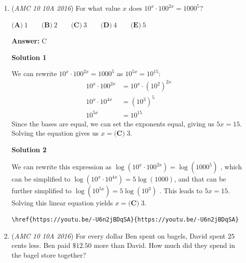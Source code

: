 \begin{enumerate}
 Hence
 \[\frac{I_{11} - I_{10}}{I_9} = \frac{11 I_{10}}{I_9} - 10.\]Do another integration by parts to relate \( I_{10} \) and \( I_9 \):
 \[I_{10} = \int_0^\infty x^{10} e^{-x} \, dx = \left[ -x^{10} e^{-x} \right]_0^\infty + 10 \int_0^\infty x^9 e^{-x} \, dx = 10 I_9.\]Therefore
 \[\frac{I_{11} - I_{10}}{I_9} = 11 \cdot 10 - 10 = 100.\]
$\boxed{(B) 100}$.

 \begin{verbatim}
\href{https://youtu.be/r5G98oPPyNM}{https://youtu.be/r5G98oPPyNM}
\end{verbatim}





	\item (\textit{AMC 10 10A 2016}) For what value $x$ does $10^{x}\cdot 100^{2x}=1000^{5}$?


 $\textbf{(A)}\ 1 \qquad\textbf{(B)}\ 2\qquad\textbf{(C)}\ 3\qquad\textbf{(D)}\ 4\qquad\textbf{(E)}\ 5$

 \textbf{Answer: }C



\textbf{Solution 1}

We can rewrite $10^{x}\cdot 100^{2x}=1000^{5}$ as $10^{5x}=10^{15}$:
 \[\begin{split} 10^x\cdot100^{2x} & =10^x\cdot(10^2)^{2x} \\ 10^x\cdot10^{4x} & =(10^3)^5 \\ 10^{5x} & =10^{15} \end{split}\]Since the bases are equal, we can set the exponents equal, giving us $5x=15$. Solving the equation gives us $x = \boxed{\textbf{(C)}\;3}.$




\textbf{Solution 2}

We can rewrite this expression as $\log(10^x \cdot 100^{2x})=\log(1000^5)$ , which can be simplified to $\log(10^{x}\cdot10^{4x})=5\log(1000)$, and that can be further simplified to $\log(10^{5x})=5\log(10^3)$ . This leads to $5x=15$. Solving this linear equation yields $x = \boxed{\textbf{(C)}\;3}.$
\begin{verbatim}
\href{https://youtu.be/-U6n2jBDqSA}{https://youtu.be/-U6n2jBDqSA}
\end{verbatim}





	\item (\textit{AMC 10 10A 2016}) For every dollar Ben spent on bagels, David spent $25$ cents less. Ben paid $\$12.50$ more than David. How much did they spend in the bagel store together?



\end{enumerate}
